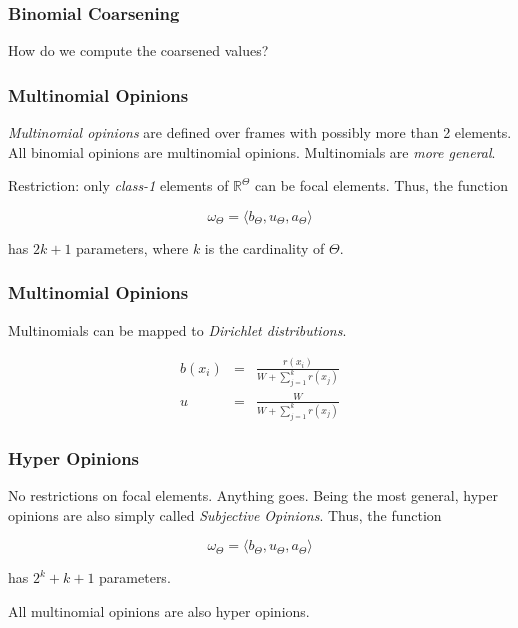 \documentclass{beamer}
\begin{document}
\begin{frame}
\frametitle{Binomial Coarsening}

How do we compute the coarsened values?

\end{frame}



\begin{frame}
\frametitle{Multinomial Opinions}

\emph{Multinomial opinions} are defined over frames with possibly more than 2 elements.
All binomial opinions are multinomial opinions. Multinomials are \emph{more general}.

Restriction: only \emph{class-1} elements of $\mathbb{R}^\Theta$ can be focal elements.
Thus, the function

$$
\omega_\Theta = \langle b_\Theta, u_\Theta, a_\Theta \rangle
$$

has $2k + 1$ parameters, where $k$ is the cardinality of $\Theta$.

\end{frame}


\begin{frame}
\frametitle{Multinomial Opinions}

Multinomials can be mapped to \emph{Dirichlet distributions}.

\begin{eqnarray}
  b(x_i) &=& \frac{r(x_i)}{W + \sum_{j = 1}^k r(x_j)} \\
  u      &=& \frac{W}{W + \sum_{j = 1}^k r(x_j)}
\end{eqnarray}

\end{frame}



\begin{frame}
\frametitle{Hyper Opinions}

No restrictions on focal elements. Anything goes. Being the most general, hyper
opinions are also simply called \emph{Subjective Opinions}. Thus, the function

$$
\omega_\Theta = \langle b_\Theta, u_\Theta, a_\Theta \rangle
$$

has $2^{k} + k + 1$ parameters.

All multinomial opinions are also hyper opinions.

\end{frame}
\end{document}
